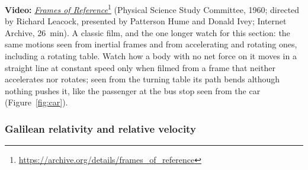 \documentclass[11pt,a4paper]{article}
\begin{document}
\begin{aside}
\textbf{Video:}
\href{https://archive.org/details/frames_of_reference}{\emph{Frames of
Reference}}\footnote{\url{https://archive.org/details/frames_of_reference}} (Physical Science
Study Committee, 1960; directed by Richard Leacock, presented by Patterson Hume and Donald Ivey;
Internet Archive, 26~min). A classic film, and the one longer watch for this section: the same
motions seen from inertial frames and from accelerating and rotating ones, including a rotating
table. Watch how a body with no net force on it moves in a straight line at constant speed only when
filmed from a frame that neither accelerates nor rotates; seen from the turning table its path
bends although nothing pushes it, like the passenger at the bus stop seen from the car
(Figure~\ref{fig:car}).
\end{aside}

\subsubsection{Galilean relativity and relative velocity}\label{sec:galilean}
\end{document}
